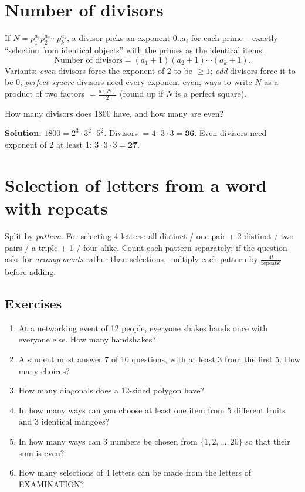 \documentclass[11pt,a4paper,openany]{report}
\newenvironment{exercises}{\subsection*{Exercises \thechapter}\begin{enumerate}[label=\textbf{\thechapter.\arabic*},leftmargin=3.2em]}{\end{enumerate}}
\begin{document}
\section{Number of divisors}
If $N=p_1^{a_1}p_2^{a_2}\cdots p_k^{a_k}$, a divisor picks an exponent $0..a_i$ for each prime --
exactly ``selection from identical objects'' with the primes as the identical items.
\[\text{Number of divisors}=(a_1+1)(a_2+1)\cdots(a_k+1).\]
Variants: \emph{even} divisors force the exponent of 2 to be $\ge1$; \emph{odd} divisors force it to be 0;
\emph{perfect-square} divisors need every exponent even; ways to write $N$ as a product of two factors
$=\frac{d(N)}2$ (round up if $N$ is a perfect square).

\begin{example}
How many divisors does 1800 have, and how many are even?

\textbf{Solution.} $1800=2^3\cdot3^2\cdot5^2$. Divisors $=4\cdot3\cdot3=\mathbf{36}$.
Even divisors need exponent of 2 at least 1: $3\cdot3\cdot3=\mathbf{27}$.
\end{example}

\section{Selection of letters from a word with repeats}
Split by \emph{pattern}. For selecting 4 letters: all distinct / one pair $+$ 2 distinct / two pairs /
a triple $+$ 1 / four alike. Count each pattern separately; if the question asks for
\emph{arrangements} rather than selections, multiply each pattern by $\frac{4!}{\text{repeats}!}$ before adding.

\begin{exercises}
\item At a networking event of 12 people, everyone shakes hands once with everyone else. How many handshakes?
\item A student must answer 7 of 10 questions, with at least 3 from the first 5. How many choices?
\item How many diagonals does a 12-sided polygon have?
\item In how many ways can you choose at least one item from 5 different fruits and 3 identical mangoes?
\item In how many ways can 3 numbers be chosen from $\{1,2,\dots,20\}$ so that their sum is even?
\item How many selections of 4 letters can be made from the letters of EXAMINATION?
\end{exercises}
\end{document}
